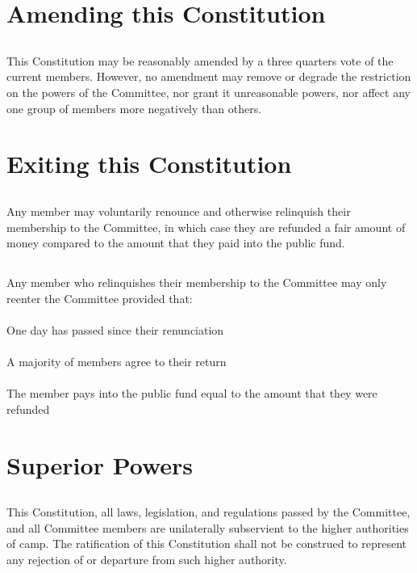 \documentclass[6pt]{bill}
\begin{document}
	\section{Amending this Constitution}{
		\subsection{}{
			This Constitution may be reasonably amended by a three quarters vote of the current members. However, no amendment may remove or degrade the restriction on the powers of the Committee, nor grant it unreasonable powers, nor affect any one group of members more negatively than others.
		}
	}
	
	\section{Exiting this Constitution}{
		\subsection{}{
			Any member may voluntarily renounce and otherwise relinquish their membership to the Committee, in which case they are refunded a fair amount of money compared to the amount that they paid into the public fund.
		}
		\subsection{}{
			Any member who relinquishes their membership to the Committee may only reenter the Committee provided that:
			\paragraph{}{
				One day has passed since their renunciation
			}
			\paragraph{}{
				A majority of members agree to their return
			}
			\paragraph{}{
				The member pays into the public fund equal to the amount that they were refunded
			}
		}
	}
	
	\section{Superior Powers}{
		\subsection{}{
			This Constitution, all laws, legislation, and regulations passed by the Committee, and all Committee members are unilaterally subservient to the higher authorities of camp. The ratification of this Constitution shall not be construed to represent any rejection of or departure from such higher authority.
		}
	}
	\eject
	
\end{document}
